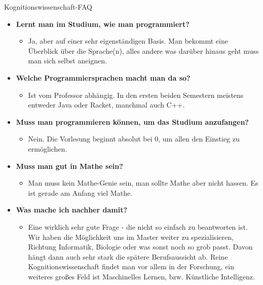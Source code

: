 \begin{LARGE}
	Kognitionswissenschaft-FAQ
\end{LARGE}
\begin{large}
\begin{itemize}
	\item \textbf{Lernt man im Studium, wie man programmiert?}
	\begin{itemize}
		\item Ja, aber auf einer sehr eigenständigen Basis. Man bekommt eine Überblick über die Sprache(n), alles andere was darüber hinaus geht muss man sich selbst aneignen.
	\end{itemize}

	
	\item \textbf{Welche Programmiersprachen macht man da so?}
	\begin{itemize}
		\item Ist vom Professor abhängig. In den ersten beiden Semestern meistens entweder Java oder Racket, manchmal auch C++.
	\end{itemize}



	\item \textbf{Muss man programmieren können, um das Studium anzufangen?}
	\begin{itemize}
		\item Nein. Die Vorlesung beginnt absolut bei 0, um allen den Einstieg zu ermöglichen.
	\end{itemize}



	\item \textbf{Muss man gut in Mathe sein?}
	\begin{itemize}
		\item Man muss kein Mathe-Genie sein, man sollte Mathe aber nicht hassen. Es ist gerade am Anfang viel Mathe.
	\end{itemize}



	\item \textbf{Was mache ich nachher damit?}
	\begin{itemize}
		\item Eine wirklich sehr gute Frage - die nicht so einfach zu beantworten ist. Wir haben die Möglichkeit uns im Master weiter zu spezialisieren, Richtung Informatik, Biologie oder was sonst noch so grob passt. Davon hängt dann auch sehr stark die spätere Berufsaussicht ab. Reine Kognitionswissenschaft findet man vor allem in der Forschung, ein weiteres großes Feld ist Maschinelles Lernen, bzw. Künstliche Intelligenz.
	\end{itemize}




\end{itemize}
\end{large}
